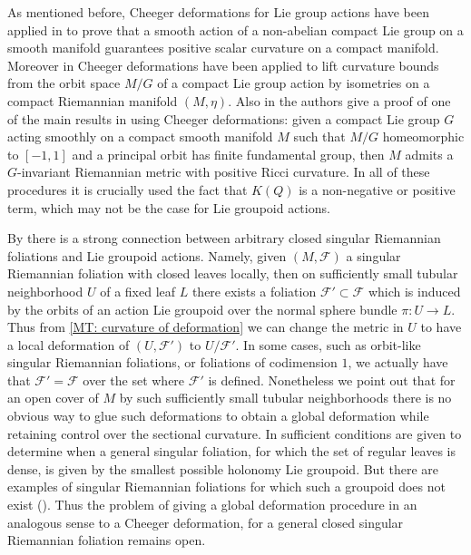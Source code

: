 \documentclass[12pt,a4paper,reqno]{amsart}
\newcommand{\1}{\mathbbm{1}} %
\newcommand{\fol}{\mathcal{F}} %
\theoremstyle{definition}
\theoremstyle{TheoremNum}
\begin{document}
As mentioned before, Cheeger deformations for Lie group actions have been applied in \cite{LawsonYau1972} to prove that a smooth action of a non-abelian compact Lie group  on a smooth manifold guarantees positive scalar curvature on a compact manifold. Moreover in \cite{SearleWilhelm2015} Cheeger deformations have been applied to lift curvature bounds from the orbit space $M/G$ of a compact Lie group action by isometries on a compact Riemannian manifold $(M,\eta)$. Also in \cite{CavenaghiESilvaSperanca2023} the authors give a proof of one of the main results in \cite{GroveZiller2002} using Cheeger deformations: given a compact Lie group $G$ acting smoothly on a compact smooth manifold $M$ such that $M/G$ homeomorphic to $[-1,1]$ and a principal orbit has finite fundamental group, then $M$ admits a $G$-invariant Riemannian metric with positive Ricci curvature. In all of these procedures it is crucially used the fact that $K(Q)$ is a non-negative or positive term, which may not be the case for Lie groupoid actions.

By \cite{AlexandrinoInagakiStruchiner2018} there is a strong connection between arbitrary closed singular Riemannian foliations and Lie groupoid actions. Namely, given $(M,\fol)$ a singular Riemannian foliation with closed leaves locally, then on sufficiently small tubular neighborhood $U$ of a fixed leaf $L$ there exists a foliation $\fol'\subset\fol$ which is induced by the orbits of an action Lie groupoid over the normal sphere bundle $\pi\colon U\to L$. Thus from \th\ref{MT: curvature of deformation} we  can change the metric in $U$ to have a local deformation of $(U,\fol')$ to $U/\fol'$. In some cases, such as orbit-like singular Riemannian foliations, or foliations of codimension $1$, we actually have that $\fol' = \fol$ over the set where $\fol'$ is defined. Nonetheless we point out that for an open cover of $M$ by such sufficiently small tubular neighborhoods there is no obvious way to glue such deformations to obtain a global deformation while retaining control over the sectional curvature. In \cite{Debord2001} sufficient conditions are given to determine when a general singular foliation, for which the set of regular leaves is dense, is given by the smallest possible holonomy Lie groupoid. But there are examples of singular Riemannian foliations for which such a groupoid does not exist (\cite[p. 496, Example 3]{Debord2001}). Thus the problem of giving a global deformation  procedure in an analogous sense to a Cheeger deformation, for a general closed singular Riemannian foliation remains open. 
\end{document}
